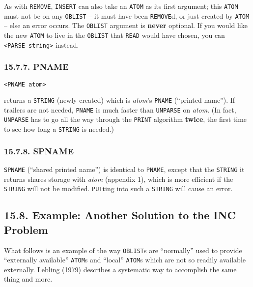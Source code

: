 \documentclass[a4paper,]{article}
\begin{document}
As with \texttt{REMOVE}, \texttt{INSERT} can also take an \texttt{ATOM} as its first argument; this \texttt{ATOM} must not
be on any \texttt{OBLIST} -- it must have been \texttt{REMOVE}d, or just created by \texttt{ATOM} -- else an error occurs.
The \texttt{OBLIST} argument is \textbf{never} optional. If you would like the new \texttt{ATOM} to live in the
\texttt{OBLIST} that \texttt{READ} would have chosen, you can \texttt{\textless{}PARSE\ string\textgreater{}} instead.

\subsubsection{15.7.7. PNAME}\label{pname}

\begin{verbatim}
<PNAME atom>
\end{verbatim}

 returns a \texttt{STRING} (newly created) which is \emph{atom}'s \texttt{PNAME} (``printed
name''). If trailers are not needed, \texttt{PNAME} is much faster than \texttt{UNPARSE} on
\emph{atom}. (In fact, \texttt{UNPARSE} has to go all the way through the \texttt{PRINT} algorithm \textbf{twice}, the
first time to see how long a \texttt{STRING} is needed.)

\subsubsection{15.7.8. SPNAME}\label{spname}

 \texttt{SPNAME} (``shared printed name'') is identical to \texttt{PNAME}, except that the
\texttt{STRING} it returns shares storage with \emph{atom} (appendix 1), which is more efficient if the \texttt{STRING}
will not be modified. \texttt{PUT}ting into such a \texttt{STRING} will cause an error.

\subsection{15.8. Example: Another Solution to the INC Problem}\label{example-another-solution-to-the-inc-problem}

What follows is an example of the way \texttt{OBLIST}s are ``normally'' used to provide ``externally available''
\texttt{ATOM}s and ``local'' \texttt{ATOM}s which are not so readily available externally. Lebling (1979) describes a
systematic way to accomplish the same thing and more.
\end{document}
